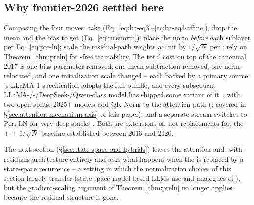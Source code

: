 \subsection{Why frontier-2026 settled here}
\label{sec:norm-frontier}

Composing the four moves: take 
(Eq.~\eqref{eq:ba-eq3}--\eqref{eq:ba-eq3-affine}), drop the mean and
the bias to get  (Eq.~\eqref{eq:rmsnorm}); place the norm
\emph{before} each sublayer per Eq.~\eqref{eq:pre-ln}; scale the
residual-path weights at init by $1/\sqrt{N}$ per
\citet[\S 2.3]{radford2019-gpt2}; rely on Theorem~\ref{thm:preln} for
-free trainability. The total cost on top of the canonical 2017
 is one bias parameter removed, one mean-subtraction
removed, one norm relocated, and one initialization scale changed --
each backed by a primary source. \citet{touvron2023}'s LLaMA-1
specification adopts the full bundle, and every subsequent
LLaMA-/-/DeepSeek-/Qwen-class model has shipped some variant
of it~\citep{jiang2023,meta-llama3,deepseek-v3,qwen3}, with two open
splits: 2025+ models add QK-Norm to the attention path
(\citealp{olmo2}; covered in \S\ref{sec:attention-mechanism-axis} of
this paper), and a separate stream switches to Peri-LN for very-deep
stacks~\citep{olmo2,gemma3,peri-ln2025}. Both are extensions of, not
replacements for, the  +  + $1/\sqrt{N}$ baseline
established between 2016 and 2020.

The next section (\S\ref{sec:state-space-and-hybrids}) leaves the
attention-and--with-residuals architecture entirely and asks what
happens when the  is replaced by a state-space
recurrence -- a setting in which the normalization choices of this
section largely transfer (state-space-model-based LLMs use  and
analogues of ), but the gradient-scaling argument of
Theorem~\ref{thm:preln} no longer applies because the residual
structure is gone.

